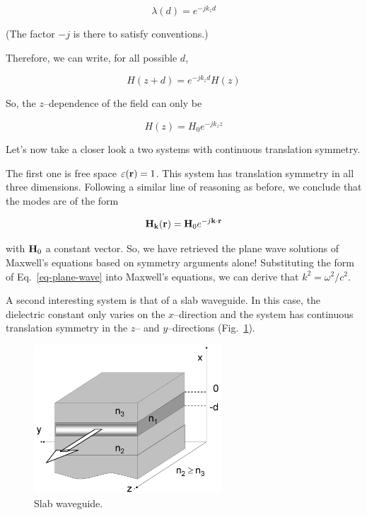 \begin{equation}
\lambda(d) = e^{-j k_z d}
\end{equation} 

(The factor $-j$ is there to satisfy conventions.)

Therefore, we can write, for all possible $d$, 

\begin{equation}
H(z + d) = e^{-j k_z d}H(z) \label{eq-bloch-degenerate}
\end{equation} 

So, the $z$--dependence of the field can only be

\begin{equation}
H(z) = H_0 e^{-j k_z z}
\end{equation} 

Let's now take a closer look a two systems with continuous translation symmetry.

The first one is free space $\varepsilon({\bf r})=1$. This system has translation symmetry in all three dimensions. Following a similar line of reasoning as before, we conclude that the modes are of the form

\begin{equation}
{\bf H}_{\bf k}({\bf r}) = {\bf H}_0 e^{-j {\bf k} \cdot {\bf r}} \label{eq-plane-wave}
\end{equation} 

with ${\bf H}_0$ a constant vector. So, we have retrieved the plane wave solutions of Maxwell's equations based on symmetry arguments alone! Substituting the form of Eq.~\ref{eq-plane-wave} into Maxwell's equations, we can derive that $k^2 = \omega^2 / c^2$.


A second interesting system is that of a slab waveguide. In this case, the dielectric constant only varies on the $x$--direction and the system has continuous translation symmetry in the $z$-- and $y$--directions (Fig.~\ref{fig-slab-wg}). 

\begin{figure}[htb]
\centering
\includegraphics[width=7cm]{periodic/figures/slabwg}
\caption{Slab waveguide.}
\label{fig-slab-wg}
\end{figure}

